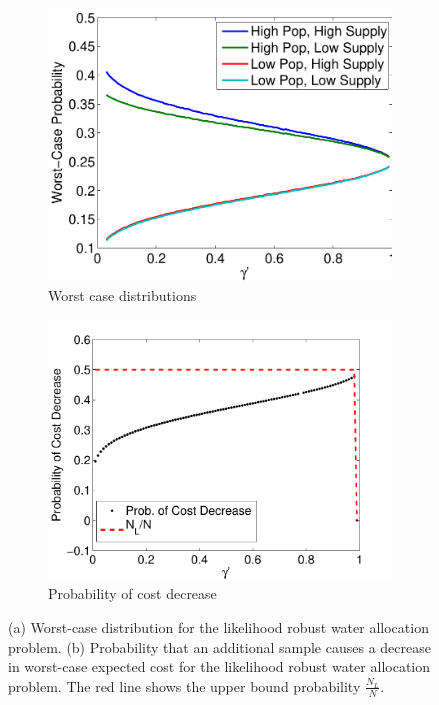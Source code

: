 \documentclass[11pt]{article}
\begin{document}
\begin{figure}
	\centering
	\begin{subfigure}{.5\textwidth}
		\includegraphics[width=\textwidth]{images/worst_case_probability}
		\caption{Worst case distributions}
		\label{fig:worst_case}
	\end{subfigure}%
	\begin{subfigure}{.5\textwidth}
		\includegraphics[width=\textwidth]{images/water_prob_decrease}
		\caption{Probability of cost decrease}
		\label{fig:water_prob_decrease}
	\end{subfigure}
	\caption{%
		(a) Worst-case distribution for the likelihood robust water allocation problem.
		(b) Probability that an additional sample causes a decrease in worst-case expected cost for the likelihood robust water allocation problem.
		The red line shows the upper bound probability $\tfrac{N_L}{N}$.
	}
\end{figure}
\end{document}
